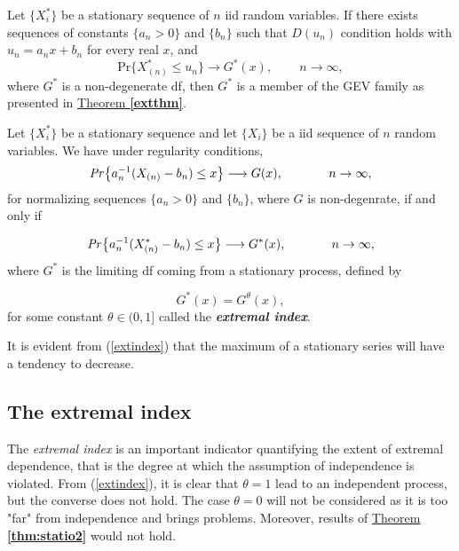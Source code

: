 \begin{theorem}
	Let $\{X^*_i\}$ be a stationary sequence of $n$ iid random variables. If there exists sequences of constants $\{a_n>0\}$ and $\{b_n\}$ such that $D(u_n)$ condition holds with $u_n=a_nx+b_n$ for every real $x$, and	
	\begin{equation}
	\text{Pr}\{X^*_{(n)}\leq u_n\}\longrightarrow G^*(x), \ \ \ \ \ \ \ \, \ \ n\rightarrow\infty,
	\end{equation}
	where $G^*$ is a non-degenerate df, then $G^*$ is a member of the GEV family as presented in \hyperref[extthm]{Theorem \textbf{\ref{extthm}}}.
	
\end{theorem}


\begin{theorem}\label{thm:statio2}
	Let $\{X^*_i\}$ be a stationary sequence and let $\{X_i\}$ be a iid sequence of $n$ random variables. We have under regularity conditions, 
	\begin{equation*}
	\text{\emph{Pr}}\big\{a_n^{-1}(X_{(n)}-b_n)\leq x\big\}\longrightarrow G(x), \ \ \ \ \ \ \ \ \ \ \ n\rightarrow \infty,
	\end{equation*}
	for normalizing sequences $\{a_n>0\}$ and $\{b_n\}$, where $G$ is non-degenrate, if and only if 
	
	\begin{equation*}\label{extremindex}
	\text{\emph{Pr}}\big\{a_n^{-1}(X^*_{(n)}-b_n)\leq x \big\}\longrightarrow G^*(x), \ \ \ \ \ \ \ \ \ \ \  n\rightarrow\infty,
	\end{equation*}
	where $G^*$ is the limiting df coming from a stationary process, defined by
	
	\begin{equation}\label{extindex}
	G^*(x)=G^{\theta}(x),
	\end{equation}
	for some constant $\theta\in (0,1]$ called the \emph{\textbf{extremal index}}.
	
\end{theorem}
It is evident from (\ref{extindex}) that the maximum of a stationary series will have a tendency to decrease.

\subsection{The extremal index}
The \emph{extremal index} is an important indicator quantifying the extent of extremal dependence, that is the degree at which the assumption of independence is violated. From (\ref{extindex}), it is clear that $\theta=1$ lead to an independent process, but the converse does not hold. The case $\theta= 0$ will not be considered as it is too "far" from independence and brings problems. Moreover, results of \hyperref[thm:statio2]{Theorem \textbf{\ref{thm:statio2}}} would not hold.

